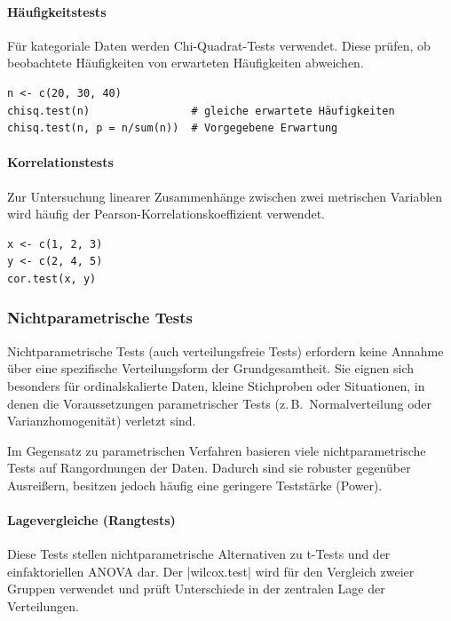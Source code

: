 \documentclass[10pt,twocolumn]{scrartcl}
\renewcommand{\lstinline}{\mycoloredinline}
\begin{document}
\paragraph{Häufigkeitstests}

Für kategoriale Daten werden Chi-Quadrat-Tests verwendet. Diese prüfen, ob beobachtete Häufigkeiten von erwarteten Häufigkeiten abweichen.

\begin{lstlisting}
n <- c(20, 30, 40)
chisq.test(n)                # gleiche erwartete Häufigkeiten
chisq.test(n, p = n/sum(n))  # Vorgegebene Erwartung
\end{lstlisting}

\paragraph{Korrelationstests}

Zur Untersuchung linearer Zusammenhänge zwischen zwei metrischen Variablen wird häufig der Pearson-Korrelationskoeffizient verwendet.

\begin{lstlisting}
x <- c(1, 2, 3)
y <- c(2, 4, 5)
cor.test(x, y)
\end{lstlisting}


\subsubsection{Nichtparametrische Tests}

Nichtparametrische Tests (auch verteilungsfreie Tests) erfordern keine Annahme über eine spezifische Verteilungsform der Grundgesamtheit. Sie eignen sich besonders für ordinalskalierte Daten, kleine Stichproben oder Situationen, in denen die Voraussetzungen parametrischer Tests (z.\,B.\ Normalverteilung oder Varianzhomogenität) verletzt sind.

Im Gegensatz zu parametrischen Verfahren basieren viele nichtparametrische Tests auf Rangordnungen der Daten. Dadurch sind sie robuster gegenüber Ausreißern, besitzen jedoch häufig eine geringere Teststärke (Power).

\paragraph{Lagevergleiche (Rangtests)}

Diese Tests stellen nichtparametrische Alternativen zu t-Tests und der einfaktoriellen ANOVA dar. Der \lstinline|wilcox.test| wird für den Vergleich zweier Gruppen verwendet und prüft Unterschiede in der zentralen Lage der Verteilungen.
\end{document}
